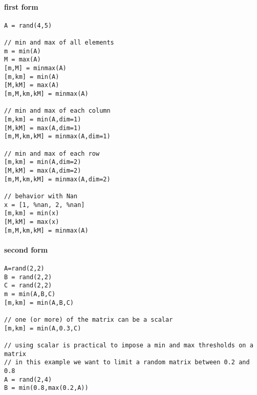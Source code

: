\begin{examples}
\paragraph{first form}
\begin{Verbatim}
A = rand(4,5) 

// min and max of all elements
m = min(A) 
M = max(A) 
[m,M] = minmax(A)
[m,km] = min(A)
[M,kM] = max(A)
[m,M,km,kM] = minmax(A)

// min and max of each column
[m,km] = min(A,dim=1)
[M,kM] = max(A,dim=1)
[m,M,km,kM] = minmax(A,dim=1)

// min and max of each row
[m,km] = min(A,dim=2)
[M,kM] = max(A,dim=2)
[m,M,km,kM] = minmax(A,dim=2)

// behavior with Nan
x = [1, %nan, 2, %nan]
[m,km] = min(x)
[M,kM] = max(x)
[m,M,km,kM] = minmax(A)
\end{Verbatim}

\paragraph{second form}
\begin{Verbatim}
A=rand(2,2) 
B = rand(2,2) 
C = rand(2,2) 
m = min(A,B,C) 
[m,km] = min(A,B,C) 

// one (or more) of the matrix can be a scalar 
[m,km] = min(A,0.3,C) 

// using scalar is practical to impose a min and max thresholds on a matrix 
// in this example we want to limit a random matrix between 0.2 and 0.8 
A = rand(2,4) 
B = min(0.8,max(0.2,A))
\end{Verbatim} 

\end{examples}

\begin{manseealso}
\end{manseealso}

